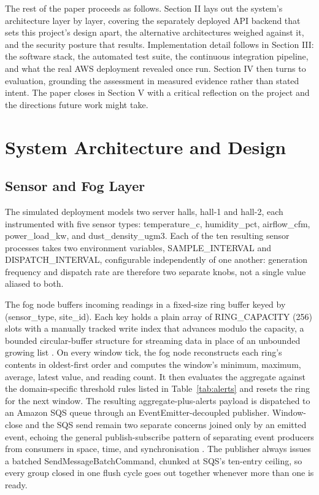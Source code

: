 \documentclass[conference]{IEEEtran}
\begin{document}
The rest of the paper proceeds as follows. Section II lays out the system's architecture layer by layer, covering the separately deployed API backend that sets this project's design apart, the alternative architectures weighed against it, and the security posture that results. Implementation detail follows in Section III: the software stack, the automated test suite, the continuous integration pipeline, and what the real AWS deployment revealed once run. Section IV then turns to evaluation, grounding the assessment in measured evidence rather than stated intent. The paper closes in Section V with a critical reflection on the project and the directions future work might take.

\section{System Architecture and Design}

\subsection{Sensor and Fog Layer}
The simulated deployment models two server halls, hall-1 and hall-2, each instrumented with five sensor types: temperature\_c, humidity\_pct, airflow\_cfm, power\_load\_kw, and dust\_density\_ugm3. Each of the ten resulting sensor processes takes two environment variables, SAMPLE\_INTERVAL and DISPATCH\_INTERVAL, configurable independently of one another: generation frequency and dispatch rate are therefore two separate knobs, not a single value aliased to both.

The fog node buffers incoming readings in a fixed-size ring buffer keyed by (sensor\_type, site\_id). Each key holds a plain array of RING\_CAPACITY (256) slots with a manually tracked write index that advances modulo the capacity, a bounded circular-buffer structure for streaming data in place of an unbounded growing list \cite{ref5,ref6}. On every window tick, the fog node reconstructs each ring's contents in oldest-first order and computes the window's minimum, maximum, average, latest value, and reading count. It then evaluates the aggregate against the domain-specific threshold rules listed in Table~\ref{tab:alerts} and resets the ring for the next window. The resulting aggregate-plus-alerts payload is dispatched to an Amazon SQS queue through an EventEmitter-decoupled publisher. Window-close and the SQS send remain two separate concerns joined only by an emitted event, echoing the general publish-subscribe pattern of separating event producers from consumers in space, time, and synchronisation \cite{ref7,ref8}. The publisher always issues a batched SendMessageBatchCommand, chunked at SQS's ten-entry ceiling, so every group closed in one flush cycle goes out together whenever more than one is ready.
\end{document}
